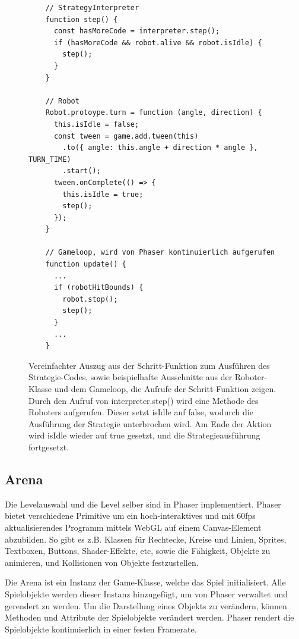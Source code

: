 \begin{figure}
  \begin{lstlisting}
    // StrategyInterpreter
    function step() {
      const hasMoreCode = interpreter.step();
      if (hasMoreCode && robot.alive && robot.isIdle) {
        step();
      }
    }

    // Robot
    Robot.protoype.turn = function (angle, direction) {
      this.isIdle = false;
      const tween = game.add.tween(this)
        .to({ angle: this.angle + direction * angle }, TURN_TIME)
        .start();
      tween.onComplete(() => {
        this.isIdle = true;
        step();
      });
    }

    // Gameloop, wird von Phaser kontinuierlich aufgerufen
    function update() {
      ...
      if (robotHitBounds) {
        robot.stop();
        step();
      }
      ...
    }
  \end{lstlisting}

  \caption{Vereinfachter Auszug aus der Schritt-Funktion zum Ausführen des Strategie-Codes, sowie
  beispielhafte Ausschnitte aus der Roboter-Klasse und dem Gameloop, die Aufrufe der
  Schritt-Funktion zeigen. Durch den Aufruf von interpreter.step() wird eine Methode des Roboters
  aufgerufen. Dieser setzt isIdle auf false, wodurch die Ausführung der Strategie unterbrochen wird.
  Am Ende der Aktion wird isIdle wieder auf true gesetzt, und die Strategieausführung fortgesetzt.}

  \label{interpreter-step}
\end{figure}


\subsection{Arena}

\label{arena-alt}

Die Levelauswahl und die Level selber sind in Phaser implementiert. Phaser bietet verschiedene
Primitive um ein hoch-interaktives und mit 60fps aktualisierendes Programm mittels WebGL auf einem
Canvas-Element abzubilden. So gibt es z.B. Klassen für Rechtecke, Kreise und Linien, Sprites,
Textboxen, Buttons, Shader-Effekte, etc, sowie die Fähigkeit, Objekte zu animieren, und Kollisionen
von Objekte festzustellen.

Die Arena ist ein Instanz der Game-Klasse, welche das Spiel initialisiert. Alle Spielobjekte werden
dieser Instanz hinzugefügt, um von Phaser verwaltet und gerendert zu werden. Um die Darstellung
eines Objekts zu verändern, können Methoden und Attribute der Spielobjekte verändert werden. Phaser
rendert die Spielobjekte kontinuierlich in einer festen Framerate.

